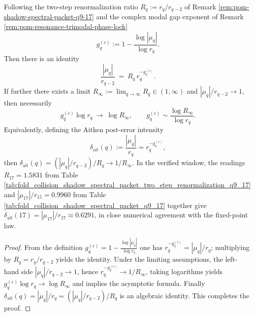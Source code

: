\begin{proposition}\label{prop:pom-two-step-renorm-fixed-point-loglaw}
Following the two-step renormalization ratio \(R_q:=r_q/r_{q-2}\) of Remark \ref{rem:pom-shadow-spectral-packet-q9-17} and the complex modal gap exponent of Remark \ref{rem:pom-resonance-trimodal-phase-lock}
\[
g_q^{(c)}:=1-\frac{\log|\mu_q|}{\log r_q}.
\]
Then there is an identity
\[
\frac{|\mu_q|}{r_{q-2}}\ =\ R_q\,r_q^{-g_q^{(c)}}.
\]
If further there exists a limit \(R_\infty:=\lim_{q\to\infty}R_q\in(1,\infty)\) and \(|\mu_q|/r_{q-2}\to 1\), then necessarily
\[
g_q^{(c)}\log r_q\ \longrightarrow\ \log R_\infty,
\qquad
g_q^{(c)}\sim \frac{\log R_\infty}{\log r_q}.
\]
Equivalently, defining the Aitken post-error intensity
\[
\delta_{\mathrm{ait}}(q):=\frac{|\mu_q|}{r_q}=r_q^{-g_q^{(c)}},
\]
then \(\delta_{\mathrm{ait}}(q)=(|\mu_q|/r_{q-2})/R_q\to 1/R_\infty\).
In the verified window, the readings \(R_{17}=1.5831\) from Table \ref{tab:fold_collision_shadow_spectral_packet_two_step_renormalization_q9_17} and \(|\mu_{17}|/r_{15}=0.9960\) from Table \ref{tab:fold_collision_shadow_spectral_packet_q9_17} together give
\(\delta_{\mathrm{ait}}(17)=|\mu_{17}|/r_{17}\approx 0.6291\), in close numerical agreement with the fixed-point law.
\end{proposition}
\begin{proof}%
From the definition \(g_q^{(c)}=1-\frac{\log|\mu_q|}{\log r_q}\) one has
\(
r_q^{-g_q^{(c)}}=|\mu_q|/r_q
\);
multiplying by \(R_q=r_q/r_{q-2}\) yields the identity.
Under the limiting assumptions, the left-hand side \(|\mu_q|/r_{q-2}\to 1\), hence \(r_q^{-g_q^{(c)}}\to 1/R_\infty\), taking logarithms yields \(g_q^{(c)}\log r_q\to \log R_\infty\) and implies the asymptotic formula.
Finally \(\delta_{\mathrm{ait}}(q)=|\mu_q|/r_q=(|\mu_q|/r_{q-2})/R_q\) is an algebraic identity. This completes the proof.
\end{proof}

